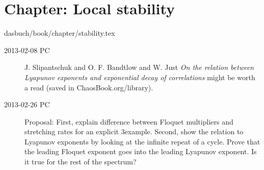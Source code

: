 \section{Chapter: Local stability}
\label{c-stability}\noindent dasbuch/book/chapter/stability.tex
\begin{description}

\item[2013-02-08 PC]
J. Slipantschuk and O. F. Bandtlow and W. Just
{\em On the relation between Lyapunov exponents and exponential decay
of correlations} might be worth a read (saved in
ChaosBook.org/library).

\item[2013-02-26 PC]                \toCB
Proposal: First, explain difference between Floquet multipliers and
stretching rates for an explicit 3\dmn example. Second, show the
relation to Lyapunov exponents by looking at the infinite repeat of a
cycle. Prove that the leading Floquet exponent goes into the leading
Lyapunov exponent. Is it true for the rest of the spectrum?


\end{description}


